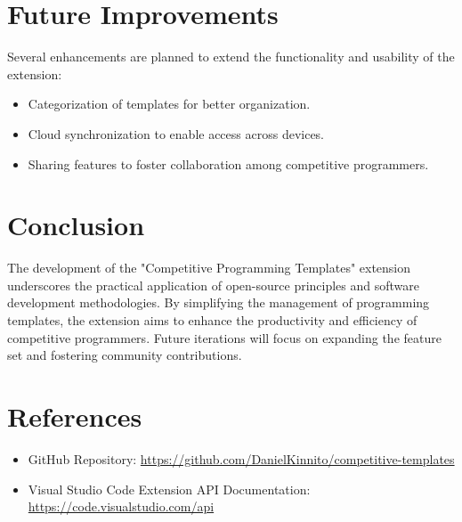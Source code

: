 \documentclass{article}
\begin{document}
\section{Future Improvements}
Several enhancements are planned to extend the functionality and usability of the extension:
\begin{itemize}
    \item Categorization of templates for better organization.
    \item Cloud synchronization to enable access across devices.
    \item Sharing features to foster collaboration among competitive programmers.
\end{itemize}

\section{Conclusion}
The development of the "Competitive Programming Templates" extension underscores the practical application of open-source principles and software development methodologies. By simplifying the management of programming templates, the extension aims to enhance the productivity and efficiency of competitive programmers. Future iterations will focus on expanding the feature set and fostering community contributions.

\section*{References}
\begin{itemize}
    \item GitHub Repository: \href{https://github.com/DanielKinnito/competitive-templates}{https://github.com/DanielKinnito/competitive-templates}
    \item Visual Studio Code Extension API Documentation: \href{https://code.visualstudio.com/api}{https://code.visualstudio.com/api}
\end{itemize}
\end{document}
